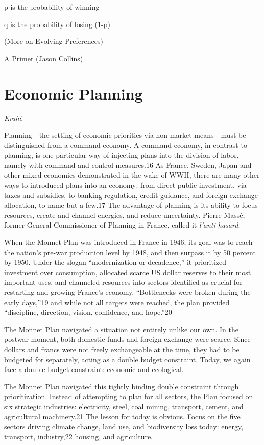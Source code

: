 \documentclass[
]{book}
\begin{document}
p is the probability of winning

q is the probability of losing (1-p)

(More on Evolving Preferences)

\href{https://jasoncollins.blog/2020/01/22/ergodicity-economics-a-primer/}{A Primer (Jason Collins)}

\hypertarget{economic-planning}{%
\chapter{Economic Planning}\label{economic-planning}}

\emph{Krahé}

Planning---the setting of economic priorities via non-market means---must be distinguished from a command economy. A command economy, in contrast to planning, is one particular way of injecting plans into the division of labor, namely with command and control measures.16 As France, Sweden, Japan and other mixed economies demonstrated in the wake of WWII, there are many other ways to introduced plans into an economy: from direct public investment, via taxes and subsidies, to banking regulation, credit guidance, and foreign exchange allocation, to name but a few.17 The advantage of planning is its ability to focus resources, create and channel energies, and reduce uncertainty. Pierre Massé, former General Commissioner of Planning in France, called it \emph{l'anti-hasard}.

When the Monnet Plan was introduced in France in 1946, its goal was to reach the nation's pre-war production level by 1948, and then surpass it by 50 percent by 1950. Under the slogan ``modernization or decadence,'' it prioritized investment over consumption, allocated scarce US dollar reserves to their most important uses, and channeled resources into sectors identified as crucial for restarting and growing France's economy. ``Bottlenecks were broken during the early days,''19 and while not all targets were reached, the plan provided ``discipline, direction, vision, confidence, and hope.''20

The Monnet Plan navigated a situation not entirely unlike our own. In the postwar moment, both domestic funds and foreign exchange were scarce. Since dollars and francs were not freely exchangeable at the time, they had to be budgeted for separately, acting as a double budget constraint. Today, we again face a double budget constraint: economic and ecological.

The Monnet Plan navigated this tightly binding double constraint through prioritization. Instead of attempting to plan for all sectors, the Plan focused on six strategic industries: electricity, steel, coal mining, transport, cement, and agricultural machinery.21 The lesson for today is obvious. Focus on the five sectors driving climate change, land use, and biodiversity loss today: energy, transport, industry,22 housing, and agriculture.
\end{document}
